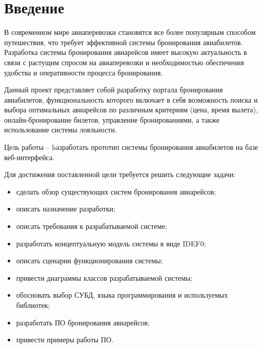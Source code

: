 \chapter*{Введение}
В современном мире авиаперевозки становятся все более популярным способом путешествия, что требует эффективной системы бронирования авиабилетов. Разработка системы бронирования авиарейсов имеет высокую актуальность в связи с растущим спросом на авиаперевозки и необходимостью обеспечения удобства и оперативности процесса бронирования.

Данный проект представляет собой разработку портала бронирования авиабилетов, функциональность которого включает в себя возможность поиска и выбора оптимальных авиарейсов по различным критериям (цена, время вылета), онлайн-бронирование билетов, управление бронированиями, а также использование системы лояльности. 

Цель работы -- hазработать прототип системы бронирования авиабилетов на базе веб-интерфейса.

Для достижения поставленной цели требуется решить следующие задачи:

\begin{itemize}
    \item сделать обзор существующих систем бронирования авиарейсов;
    \item описать назначение разработки;
    \item описать требования к разрабатываемой системе;
    \item разработать концептуальную модель системы в виде IDEF0;
    \item описать сценарии функционирования системы;
    \item привести диаграммы классов разрабатываемой системы;
    \item обосновать выбор СУБД, языка программирования и используемых библиотек;
    \item разработать ПО бронирования авиарейсов;
    \item привести примеры работы ПО.
\end{itemize}
